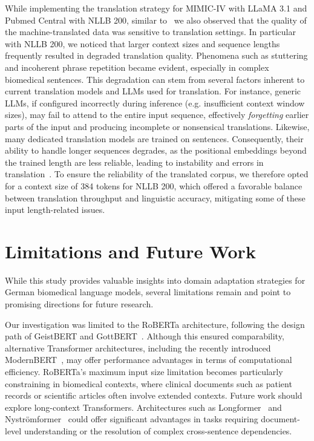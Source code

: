 While implementing the translation strategy for MIMIC-IV with LLaMA 3.1 and
Pubmed Central with NLLB 200, similar to~\cite{dada2023impact} we also observed
that the quality of the machine-translated data was sensitive to translation
settings. In particular with NLLB 200, we noticed that larger context sizes and
sequence lengths frequently resulted in degraded translation quality. Phenomena
such as stuttering and incoherent phrase repetition became evident, especially
in complex biomedical sentences. This degradation can stem from several factors
inherent to current translation models and LLMs used for translation. For
instance, generic LLMs, if configured incorrectly during inference (e.g.
insufficient context window sizes), may fail to attend to the entire input
sequence, effectively \textit{forgetting} earlier parts of the input and
producing incomplete or nonsensical translations. Likewise, many dedicated
translation models are trained on sentences. Consequently, their ability to
handle longer sequences degrades, as the positional embeddings beyond the
trained length are less reliable, leading to instability and errors in
translation~\cite{costa2022no}. To ensure the reliability of the translated
corpus, we therefore opted for a context size of 384 tokens for NLLB 200, which
offered a favorable balance between translation throughput and linguistic
accuracy, mitigating some of these input length-related issues.

\section{Limitations and Future Work} \label{sec:limitations}

While this study provides valuable insights into domain adaptation strategies
for German biomedical language models, several limitations remain and point to
promising directions for future research.

Our investigation was limited to the RoBERTa architecture, following the design
path of GeistBERT and GottBERT~\cite{scheible2020gottbert}. Although this
ensured comparability, alternative Transformer architectures, including the
recently introduced ModernBERT~\cite{warner2024smarter}, may offer performance
advantages in terms of computational efficiency. RoBERTa's maximum input size
limitation becomes particularly constraining in biomedical contexts, where
clinical documents such as patient records or scientific articles often involve
extended contexts. Future work should explore long-context Transformers.
Architectures such as Longformer~\cite{beltagy2020longformer} and
Nyströmformer~\cite{xiong2021nystromformer} could offer significant advantages
in tasks requiring document-level understanding or the resolution of complex
cross-sentence dependencies.

